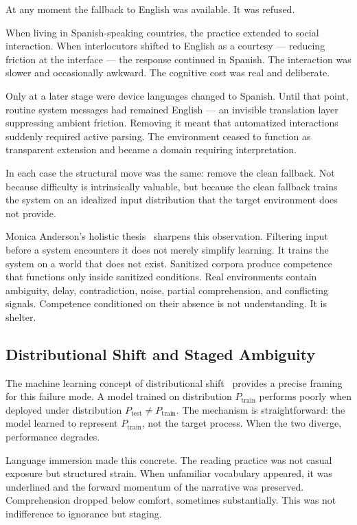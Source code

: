 \documentclass[11pt]{article}
\theoremstyle{remark}
\begin{document}
At any moment the fallback to English was available. It was refused.

When living in Spanish-speaking countries, the practice extended to social interaction. When interlocutors shifted to English as a courtesy — reducing friction at the interface — the response continued in Spanish. The interaction was slower and occasionally awkward. The cognitive cost was real and deliberate.

Only at a later stage were device languages changed to Spanish. Until that point, routine system messages had remained English — an invisible translation layer suppressing ambient friction. Removing it meant that automatized interactions suddenly required active parsing. The environment ceased to function as transparent extension and became a domain requiring interpretation.

In each case the structural move was the same: remove the clean fallback. Not because difficulty is intrinsically valuable, but because the clean fallback trains the system on an idealized input distribution that the target environment does not provide.

Monica Anderson's holistic thesis~\cite{anderson} sharpens this observation. Filtering input before a system encounters it does not merely simplify learning. It trains the system on a world that does not exist. Sanitized corpora produce competence that functions only inside sanitized conditions. Real environments contain ambiguity, delay, contradiction, noise, partial comprehension, and conflicting signals. Competence conditioned on their absence is not understanding. It is shelter.

\subsection{Distributional Shift and Staged Ambiguity}

The machine learning concept of distributional shift~\cite{quinonero} provides a precise framing for this failure mode. A model trained on distribution $P_{\text{train}}$ performs poorly when deployed under distribution $P_{\text{test}} \neq P_{\text{train}}$. The mechanism is straightforward: the model learned to represent $P_{\text{train}}$, not the target process. When the two diverge, performance degrades.

Language immersion made this concrete. The reading practice was not casual exposure but structured strain. When unfamiliar vocabulary appeared, it was underlined and the forward momentum of the narrative was preserved. Comprehension dropped below comfort, sometimes substantially. This was not indifference to ignorance but staging.
\end{document}
